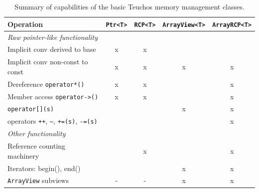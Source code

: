 \documentclass[pdf,ps2pdf,11pt]{SANDreport}
\begin{document}
\begin{table}
\begin{center}
\begin{tabular}{|l|c|c|c|c|}
%
\hline
%
Operation
& \texttt{Ptr<T>}
& \texttt{RCP<T>}
& \texttt{ArrayView<T>}
& \texttt{ArrayRCP<T>} \\
%
\hline
%
\multicolumn{5}{l}{\textit{Raw pointer-like functionality}} \\
%
\hline
%
Implicit conv derived to base
& x
& x
& 
&  \\
%
\hline
%
Implicit conv non-const to const
& x
& x
& x
& x \\
%
\hline
%
Dereference \texttt{operator*()}
& x
& x
& 
& x \\
%
\hline
%
Member access \texttt{operator->()}
& x
& x
& 
& x \\
%
\hline
%
\texttt{operator[](s)}
& 
& 
& x
& x \\
%
\hline
%
operators \texttt{++}, \texttt{--}, \texttt{+=(s)}, \texttt{-=(s)}
& 
& 
& 
& x \\
%
\hline
%
\multicolumn{5}{l}{\textit{Other functionality}} \\
%
\hline
%
Reference counting machinery
& 
& x
& 
& x \\
%
\hline
%
Iterators: begin(), end()
& 
& 
& x
& x \\
%
\hline
%
\texttt{ArrayView} subviews
& -
& -
& x
& x \\
%
\hline
%
\end{tabular}
\end{center}
\caption{\label{tbl:TypesSummary}
Summary of capabilities of the basic Teuchos memory management
classes.}
\end{table}
\end{document}
